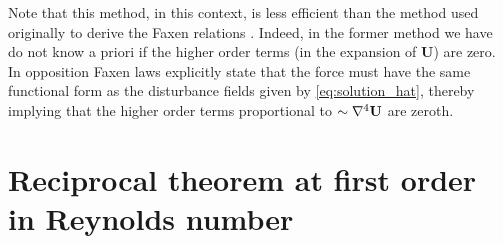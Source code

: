 Note that this method, in this context, is less efficient than the method used originally to derive the Faxen relations \citet{kim2013microhydrodynamics}. 
Indeed, in the former method we have do not know a priori if the higher order terms (in the expansion of $\textbf{U}$) are zero.
In opposition Faxen laws explicitly state that the force must have the same functional form as the disturbance fields given by \ref{eq:solution_hat}, thereby implying that the higher order terms proportional to $\sim \mathbf{\nabla}^4 \textbf{U}$ are zeroth. 


\section{Reciprocal theorem at first order in Reynolds number}

